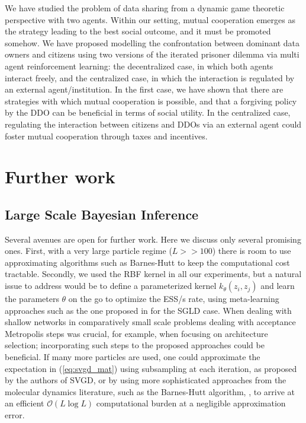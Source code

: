 
We have studied the problem of data sharing
from a dynamic game theoretic perspective with two agents.
Within our setting,  mutual cooperation emerges as the strategy 
leading to the best social outcome, and it must be promoted somehow. We
have proposed modelling the confrontation between dominant data owners and citizens using two versions of the iterated prisoner dilemma via  
multi agent reinforcement learning: the decentralized case, in which both agents interact freely, and the centralized case, in which the interaction is regulated by an external agent/institution. In the first case, we have shown that there are strategies with which mutual cooperation is possible, and that a forgiving policy by the DDO can be beneficial in terms of social utility. In the centralized case, regulating the interaction between citizens and DDOs via an external agent could foster mutual cooperation through taxes and incentives.


\section{Further work}

\subsection{Large Scale Bayesian Inference}
Several avenues are open for further work. Here we discuss only several promising ones. First, with a very large particle regime ($L >> 100$) there is room to use approximating algorithms such as Barnes-Hutt to keep the computational cost tractable.
Secondly, we used the RBF kernel in all our experiments, but a natural 
issue to address would be to define a parameterized kernel $k_{\theta} (z_i, z_j)$ and learn the parameters $\theta$ on the go to optimize the ESS/s rate, using meta-learning approaches such as the one proposed in \parencite{gallego2019vis} for the SGLD case.
When dealing with shallow networks in comparatively small scale problems
\parencite{muller1998issues} dealing with acceptance Metropolis steps was crucial, for example,
when focusing on architecture selection; incorporating such steps
to the proposed approaches could be beneficial. 
If many more particles are  used, one could approximate the expectation in (\ref{eq:svgd_mat}) using subsampling at each iteration, as proposed by the authors of SVGD, or by using more sophisticated approaches from the molecular dynamics literature, such as the Barnes-Hutt algorithm, \parencite{barnes1986hierarchical}, to arrive at an efficient $\mathcal{O}(L \log L)$ computational burden at a negligible approximation error.


